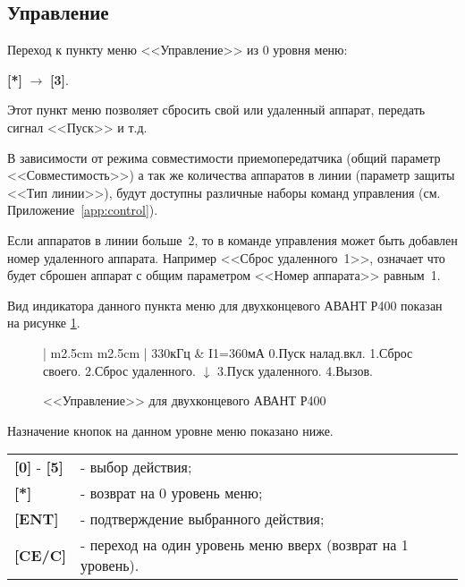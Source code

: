 \subsection{Управление}

Переход к пункту меню <<Управление>> из 0 уровня меню: 

\textbf{[*]} $\rightarrow$ \textbf{[3]}.

Этот пункт меню позволяет сбросить свой или удаленный аппарат, передать сигнал <<Пуск>> и т.д. 

В зависимости от режима совместимости приемопередатчика (общий параметр <<Совместимость>>) а так же количества аппаратов в линии (параметр защиты <<Тип линии>>), будут доступны различные наборы команд управления (см. Приложение~\ref{app:control}). 

Если аппаратов в линии больше~2, то в команде управления может быть добавлен номер удаленного аппарата. Например <<Сброс удаленного~1>>, означает что будет сброшен аппарат с общим параметром <<Номер аппарата>> равным~1.

Вид индикатора данного пункта меню для двухконцевого АВАНТ Р400 показан на рисунке \ref{fig:control}. 

\begin{figure}[H]
	\centering
	
	\begin{tabular}{| m{2.5cm}  m{2.5cm} |}
		\firsthline
		330кГц	& \raggedleft I1=360мА				\tabularnewline 
		 {0.Пуск налад.вкл.}	\tabularnewline 
		 {1.Сброс своего. }		\tabularnewline 
		 {2.Сброс удаленного.} 	\tabularnewline \hline
		 {$\downarrow$}			\tabularnewline
		 {3.Пуск удаленного.} 	\tabularnewline 
		 {4.Вызов.}				\tabularnewline 
		\lasthline
	\end{tabular} 
	
	\caption{<<Управление>> для двухконцевого АВАНТ Р400}
	\label{fig:control}
\end{figure}

Назначение кнопок на данном уровне меню показано ниже.
\begin{center}
	\begin{tabular}{p{2cm} p{15cm}}
		\textbf{[0]} - \textbf{[5]} & - выбор действия; \tabularnewline 
		\textbf{[*]} 	& - возврат на 0 уровень меню; \tabularnewline
		\textbf{[ENT]} 	& - подтверждение выбранного действия; \tabularnewline
		\textbf{[CE/C]} & - переход на один уровень меню вверх (возврат на 1 уровень). \tabularnewline				
	\end{tabular} 
\end{center}